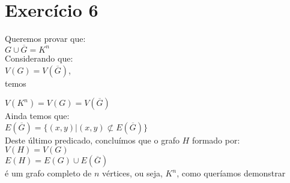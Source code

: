 \section{Exercício 6} 

Queremos provar que: \\

$G \cup \overline{G} = K^n$ \\

\noindent
Considerando que: \\

$V(G) = V(\overline{G})$, \\

\noindent
temos

$V(K^n) = V(G) = V(\overline{G})$ \\


\noindent
Ainda temos que: \\

$E(\overline{G}) = \{(x, y) | (x, y) \not\subset E(\overline{G})\}$ \\

\noindent
Deste último predicado, concluímos que o grafo $H$ formado por: \\

$V(H) = V(G)$ \\
$E(H) = E(G) \cup E(\overline{G})$ \\

é um grafo completo de $n$ vértices, ou seja, $K^n$, como queríamos demonstrar
